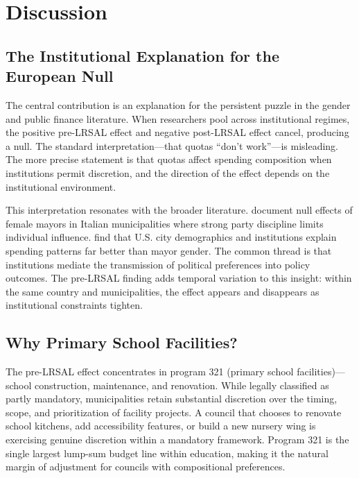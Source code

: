 \documentclass[12pt]{article}
\begin{document}
\section{Discussion}

\subsection{The Institutional Explanation for the European Null}

The central contribution is an explanation for the persistent puzzle in the gender and public finance literature. When researchers pool across institutional regimes, the positive pre-LRSAL effect and negative post-LRSAL effect cancel, producing a null. The standard interpretation---that quotas ``don't work''---is misleading. The more precise statement is that quotas affect spending composition when institutions permit discretion, and the direction of the effect depends on the institutional environment.

This interpretation resonates with the broader literature. \citet{gagliarducci2013gender} document null effects of female mayors in Italian municipalities where strong party discipline limits individual influence. \citet{ferreira2014does} find that U.S. city demographics and institutions explain spending patterns far better than mayor gender. The common thread is that institutions mediate the transmission of political preferences into policy outcomes. The pre-LRSAL finding adds temporal variation to this insight: within the same country and municipalities, the effect appears and disappears as institutional constraints tighten.

\subsection{Why Primary School Facilities?}

The pre-LRSAL effect concentrates in program 321 (primary school facilities)---school construction, maintenance, and renovation. While legally classified as partly mandatory, municipalities retain substantial discretion over the timing, scope, and prioritization of facility projects. A council that chooses to renovate school kitchens, add accessibility features, or build a new nursery wing is exercising genuine discretion within a mandatory framework. Program 321 is the single largest lump-sum budget line within education, making it the natural margin of adjustment for councils with compositional preferences.
\end{document}
